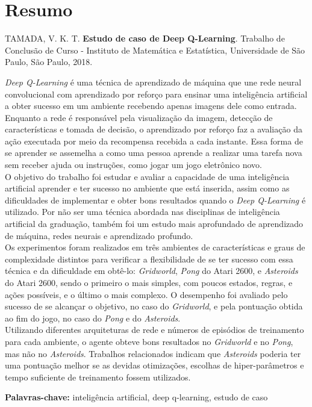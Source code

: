 \chapter*{Resumo}
%
\noindent%
TAMADA, V. K. T. \textbf{Estudo de caso de Deep Q-Learning}. Trabalho de Conclusão de Curso
 - Instituto de Matemática e Estatística, Universidade de São Paulo,
São Paulo, 2018.
\bigskip

\textit{Deep Q-Learning} é uma técnica de aprendizado de máquina que une rede neural convolucional com aprendizado por reforço para ensinar uma inteligência artificial a obter sucesso em um ambiente recebendo apenas imagens dele como entrada.
Enquanto a rede é responsável pela visualização da imagem, detecção de características e tomada de decisão, o aprendizado por reforço faz a avaliação da ação executada por meio da recompensa recebida a cada instante.
Essa forma de se aprender se assemelha a como uma pessoa aprende a realizar uma tarefa nova sem receber ajuda ou instruções, como jogar um jogo eletrônico novo.\\

O objetivo do trabalho foi estudar e avaliar a capacidade de uma inteligência artificial aprender e ter sucesso no ambiente que está inserida, assim como as dificuldades de implementar e obter bons resultados quando o \textit{Deep Q-Learning} é utilizado.
Por não ser uma técnica abordada nas disciplinas de inteligência artificial da graduação, também foi um estudo mais aprofundado de aprendizado de máquina, redes neurais e aprendizado profundo.\\

Os experimentos foram realizados em três ambientes de características e graus de complexidade distintos para verificar a flexibilidade de se ter sucesso com essa técnica e da dificuldade em obtê-lo: \textit{Gridworld}, \textit{Pong} do Atari 2600, e \textit{Asteroids} do Atari 2600, sendo o primeiro o mais simples, com poucos estados, regras, e ações possíveis, e o último o mais complexo.
O desempenho foi avaliado pelo sucesso de se alcançar o objetivo, no caso do \textit{Gridworld}, e pela pontuação obtida ao fim do jogo, no caso do \textit{Pong} e do \textit{Asteroids}.\\

Utilizando diferentes arquiteturas de rede e números de episódios de treinamento para cada ambiente, o agente obteve bons resultados no \textit{Gridworld} e no \textit{Pong}, mas não no \textit{Asteroids}.
Trabalhos relacionados indicam que \textit{Asteroids} poderia ter uma pontuação melhor se as devidas otimizações, escolhas de hiper-parâmetros e tempo suficiente de treinamento fossem utilizados.
\bigskip

\noindent
\textbf{Palavras-chave:} inteligência artificial, deep q-learning, estudo de caso

